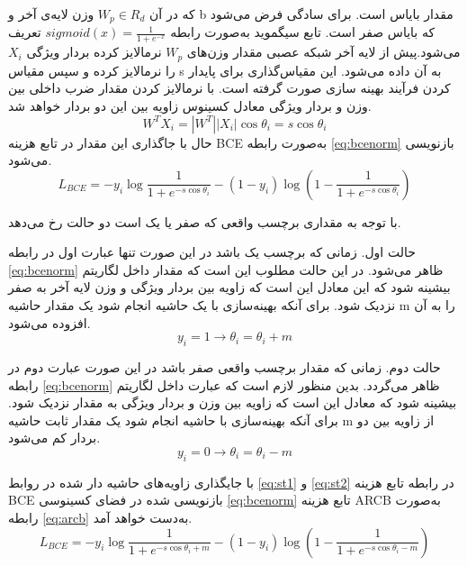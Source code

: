 که در آن  
$W_p \in R_d$
وزن لایه‌ی آخر و b مقدار بایاس است. برای سادگی فرض می‌شود که بایاس صفر است.  تابع سیگموید به‌صورت رابطه
$sigmoid(x) = \frac{1}{1+e^{-x}}$
 تعریف می‌شود.پیش از لایه آخر شبکه عصبی مقدار وزن‌های 
$W_p$
 نرمالایز کرده بردار ویژگی 
 $X_i$
  را نرمالایز کرده و سپس مقیاس s به آن داده می‌شود. این مقیاس‌گذاری برای پایدار کردن فرآیند بهینه سازی صورت گرفته است.
  با نرمالایز کردن مقدار ضرب داخلی بین وزن و بردار ویژگی معادل کسینوس زاویه بین این دو بردار خواهد شد.
 \begin{equation}\label{eq:pyi}
	W^TX_i = |W^T||X_i| \cos{\theta_i}=s\cos{\theta_i}
 \end{equation}
حال با جاگذاری این مقدار در تابع هزینه BCE به‌صورت رابطه
\ref{eq:bcenorm}
 بازنویسی می‌شود.
\begin{equation}\label{eq:bcenorm}
	L_{BCE} = -y_i \log{\frac{1}{1+e^{-s\cos{\theta_i}}}} - (1-y_i)\log{(1-\frac{1}{1+e^{-s\cos{\theta_i}}} )}
\end{equation}

با توجه به مقداری برچسب واقعی  که صفر یا یک است دو حالت رخ می‌دهد.

حالت اول. زمانی که برچسب یک باشد در این صورت تنها عبارت اول در رابطه 
\ref{eq:bcenorm}
 ظاهر می‌شود. در این حالت مطلوب این است که مقدار داخل لگاریتم بیشینه شود که این معادل این است که زاویه بین بردار ویژگی و وزن لایه آخر به صفر نزدیک شود. برای آنکه بهینه‌سازی با یک حاشیه انجام شود یک مقدار حاشیه m را به آن افزوده می‌شود.
  \begin{equation}\label{eq:st1}
 	y_i=1 \to \theta_i= \theta_i + m
 \end{equation}

حالت دوم. زمانی که مقدار برچسب واقعی صفر باشد در این صورت عبارت دوم در رابطه 
\ref{eq:bcenorm}
 ظاهر می‌گردد. بدین منظور لازم است که عبارت داخل لگاریتم بیشینه شود که معادل این است که زاویه بین وزن و بردار ویژگی به مقدار  نزدیک شود. برای آنکه بهینه‌سازی با حاشیه انجام شود یک مقدار ثابت حاشیه m از زاویه بین دو بردار کم می‌شود.
   \begin{equation}\label{eq:st2}
 	y_i=0 \to \theta_i= \theta_i - m
 \end{equation}

با جایگذاری زاویه‌های حاشیه دار شده در روابط 
\ref{eq:st1}
 و 
 \ref{eq:st2}
 در رابطه تابع هزینه BCE بازنویسی شده در فضای کسینوسی 
 \ref{eq:bcenorm}
 تابع هزینه ARCB به‌صورت رابطه
\ref{eq:arcb}
  به‌دست خواهد آمد.
\begin{equation}\label{eq:arcb}
	L_{BCE} = -y_i \log{\frac{1}{1+e^{-s\cos{\theta_i+m}}}} - (1-y_i)\log{(1-\frac{1}{1+e^{-s\cos{\theta_i-m}}} )}
\end{equation}

